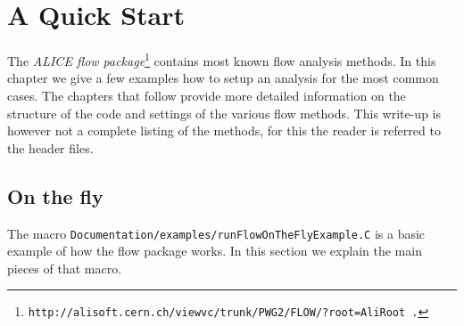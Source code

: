 \chapter{A Quick Start}
\label{quickstart}
The \textit{ALICE flow package}\footnote{\texttt{http://alisoft.cern.ch/viewvc/trunk/PWG2/FLOW/?root=AliRoot .}} 
contains most known flow analysis methods.  In this chapter we give a few examples how to setup an
analysis for the most common cases. The chapters that follow provide more detailed information on the structure of the code 
and settings of the various flow methods. 
This write-up is however not a complete listing of the methods, for this the reader is referred to the header files.
 
\section{On the fly}
The macro \texttt{Documentation/examples/runFlowOnTheFlyExample.C} 
 is a basic example of how the flow package works. 
In this section we explain the main pieces of that macro.

